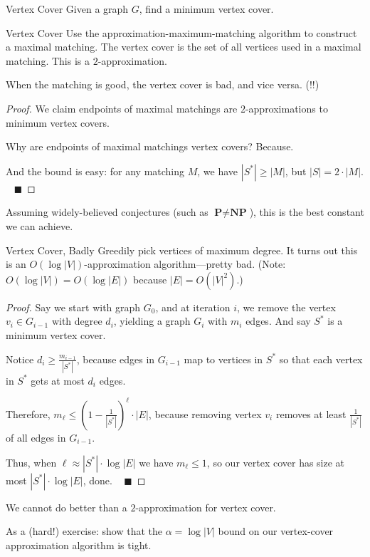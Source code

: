 \begin{problem}{Vertex Cover}
    Given a graph $G$, find a minimum vertex cover.
\end{problem}

\begin{solution}{Vertex Cover}
    Use the approximation-maximum-matching algorithm to construct a maximal matching.  The vertex cover is the set of all vertices used in a maximal matching.  This is a $2$-approximation.
\end{solution}

\begin{remark}
    When the matching is good, the vertex cover is bad, and vice versa. (!!)
\end{remark}

\begin{proof}
    We claim endpoints of maximal matchings are $2$-approximations to minimum vertex covers.
    
    Why are endpoints of maximal matchings vertex covers? Because.
        
    And the bound is easy: for any matching $M$, we have $|S^*| \geq |M|$, but $|S| = 2 \cdot |M|$. ~ $\blacksquare$
\end{proof}

Assuming widely-believed conjectures (such as $\textbf{P} \neq \textbf{NP}$), this is the best constant we can achieve.

\begin{solution}{Vertex Cover, Badly}
    Greedily pick vertices of maximum degree.  It turns out this is an $O(\log |V|)$-approximation algorithm---pretty bad.  (Note: $O(\log |V|) = O(\log |E|)$ because $|E| = O(|V|^2)$.)
\end{solution}

\begin{proof}
     Say we start with graph $G_0$, and at iteration $i$, we remove the vertex $v_i \in G_{i - 1}$ with degree $d_i$, yielding a graph $G_i$ with $m_i$ edges.  And say $S^*$ is a minimum vertex cover.

     Notice $d_i \geq \frac{m_{i - 1}}{|S^*|}$, because edges in $G_{i - 1}$ map to vertices in $S^*$ so that each vertex in $S^*$ gets at most $d_i$ edges.

     Therefore, $m_{\ell} \leq \left(1 - \frac{1}{|S^*|}\right)^{\ell} \cdot |E|$, because removing vertex $v_i$ removes at least $\frac{1}{|S^*|}$ of all edges in $G_{i - 1}$.
     
     Thus, when $\ell \approx |S^*| \cdot \log |E|$ we have $m_{\ell} \leq 1$, so our vertex cover has size at most $|S^*| \cdot \log|E|$, done. ~ $\blacksquare$
\end{proof}

\begin{remark}
    We cannot do better than a $2$-approximation for vertex cover.

    As a (hard!) exercise: show that the $\alpha = \log |V|$ bound on our vertex-cover approximation algorithm is tight.
\end{remark}

